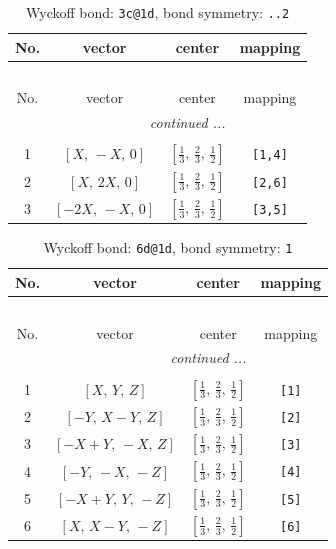 \documentclass[fleqn,8pt]{jsarticle}
\begin{document}
\begin{longtable}{cccc}
\caption{Wyckoff bond: {\tt 3c@1d}, bond symmetry: {\tt ..2}}
 \\
 \hline \hline
No. & vector & center & mapping \\ \hline \endfirsthead

\multicolumn{3}{l}{\tablename\ \thetable{}} \\
 \hline \hline
No. & vector & center & mapping \\ \hline \endhead

 \hline \hline
\multicolumn{3}{r}{\footnotesize\it continued ...} \\ \endfoot

 \hline \hline
\multicolumn{3}{r}{} \\ \endlastfoot

1 & $\left[ X,\, - X,\, 0 \right]$ & $\left[ \frac{1}{3},\, \frac{2}{3},\, \frac{1}{2} \right]$ & {\tt [1,4]} \\ \hline
2 & $\left[ X,\, 2 X,\, 0 \right]$ & $\left[ \frac{1}{3},\, \frac{2}{3},\, \frac{1}{2} \right]$ & {\tt [2,6]} \\ \hline
3 & $\left[ - 2 X,\, - X,\, 0 \right]$ & $\left[ \frac{1}{3},\, \frac{2}{3},\, \frac{1}{2} \right]$ & {\tt [3,5]} \\
\end{longtable}
\renewcommand{\arraystretch}{1.2}
\begin{longtable}{cccc}
\caption{Wyckoff bond: {\tt 6d@1d}, bond symmetry: {\tt 1}}
 \\
 \hline \hline
No. & vector & center & mapping \\ \hline \endfirsthead

\multicolumn{3}{l}{\tablename\ \thetable{}} \\
 \hline \hline
No. & vector & center & mapping \\ \hline \endhead

 \hline \hline
\multicolumn{3}{r}{\footnotesize\it continued ...} \\ \endfoot

 \hline \hline
\multicolumn{3}{r}{} \\ \endlastfoot

1 & $\left[ X,\, Y,\, Z \right]$ & $\left[ \frac{1}{3},\, \frac{2}{3},\, \frac{1}{2} \right]$ & {\tt [1]} \\ \hline
2 & $\left[ - Y,\, X - Y,\, Z \right]$ & $\left[ \frac{1}{3},\, \frac{2}{3},\, \frac{1}{2} \right]$ & {\tt [2]} \\ \hline
3 & $\left[ - X + Y,\, - X,\, Z \right]$ & $\left[ \frac{1}{3},\, \frac{2}{3},\, \frac{1}{2} \right]$ & {\tt [3]} \\ \hline
4 & $\left[ - Y,\, - X,\, - Z \right]$ & $\left[ \frac{1}{3},\, \frac{2}{3},\, \frac{1}{2} \right]$ & {\tt [4]} \\ \hline
5 & $\left[ - X + Y,\, Y,\, - Z \right]$ & $\left[ \frac{1}{3},\, \frac{2}{3},\, \frac{1}{2} \right]$ & {\tt [5]} \\ \hline
6 & $\left[ X,\, X - Y,\, - Z \right]$ & $\left[ \frac{1}{3},\, \frac{2}{3},\, \frac{1}{2} \right]$ & {\tt [6]} \\
\end{longtable}
\end{document}
